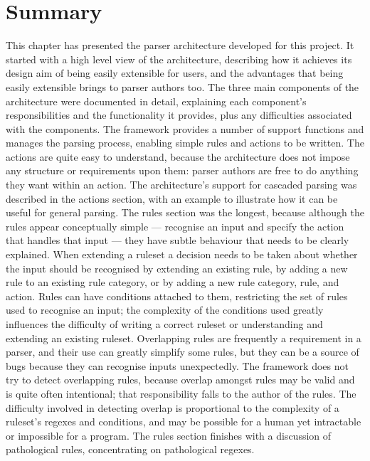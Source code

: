 \section{Summary}

This chapter has presented the parser architecture developed for this
project.  It started with a high level view of the architecture, describing
how it achieves its design aim of being easily extensible for users, and
the advantages that being easily extensible brings to parser authors too.
The three main components of the architecture were documented in detail,
explaining each component's responsibilities and the functionality it
provides, plus any difficulties associated with the components.  The
framework provides a number of support functions and manages the parsing
process, enabling simple rules and actions to be written.  The actions are
quite easy to understand, because the architecture does not impose any
structure or requirements upon them: parser authors are free to do anything
they want within an action.  The architecture's support for cascaded
parsing was described in the actions section, with an example to illustrate
how it can be useful for general parsing.  The rules section was the
longest, because although the rules appear conceptually simple ---
recognise an input and specify the action that handles that input --- they
have subtle behaviour that needs to be clearly explained.  When extending a
ruleset a decision needs to be taken about whether the input should be
recognised by extending an existing rule, by adding a new rule to an
existing rule category, or by adding a new rule category, rule, and action.
Rules can have conditions attached to them, restricting the set of rules
used to recognise an input; the complexity of the conditions used greatly
influences the difficulty of writing a correct ruleset or understanding and
extending an existing ruleset.  Overlapping rules are frequently a
requirement in a parser, and their use can greatly simplify some rules, but
they can be a source of bugs because they can recognise inputs
unexpectedly.  The framework does not try to detect overlapping rules,
because overlap amongst rules may be valid and is quite often intentional;
that responsibility falls to the author of the rules.  The difficulty
involved in detecting overlap is proportional to the complexity of a
ruleset's regexes and conditions, and may be possible for a human yet
intractable or impossible for a program.  The rules section finishes with a
discussion of pathological rules, concentrating on pathological regexes.
